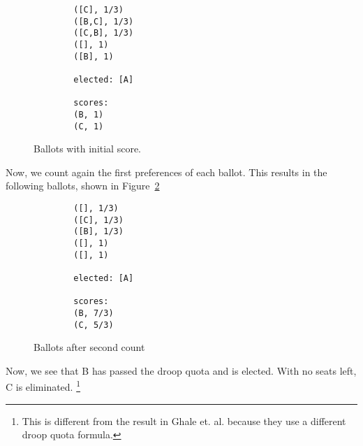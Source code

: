 \begin{figure}[ht!!!!!!!!]
    \caption{Ballots with initial score.}
    \label{sample_election1}
    \begin{lstlisting}
        ([C], 1/3)
        ([B,C], 1/3)
        ([C,B], 1/3)
        ([], 1)
        ([B], 1)
        
        elected: [A]
        
        scores: 
        (B, 1)
        (C, 1)
    \end{lstlisting}
\end{figure}

Now, we count again the first preferences of each ballot. This results in the
following ballots, shown in Figure~\ref{sample_election2}

\begin{figure}[ht!!!!!!!!]
    \caption{Ballots after second count}
    \label{sample_election2}
    \begin{lstlisting}
        ([], 1/3)
        ([C], 1/3)
        ([B], 1/3)
        ([], 1)
        ([], 1)
        
        elected: [A]
        
        scores: 
        (B, 7/3)
        (C, 5/3)
    \end{lstlisting}
\end{figure}

Now, we see that B has passed the droop quota and is elected. With no seats
left, C is eliminated. \footnote{This is different from the result in Ghale et.
al. because they use a different droop quota formula.}

